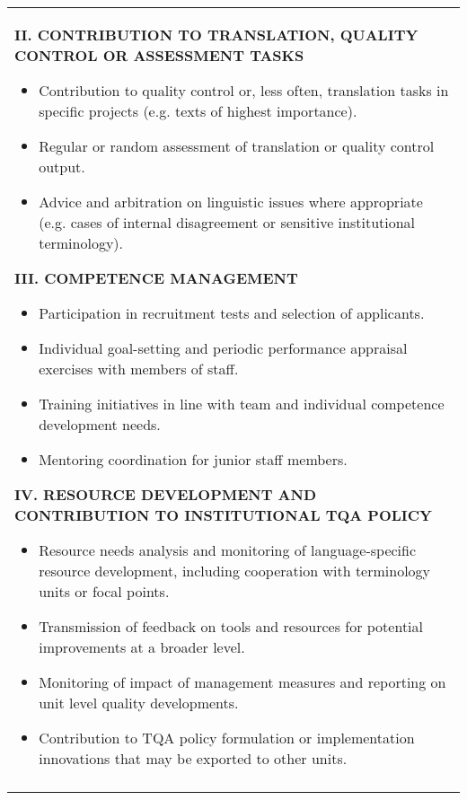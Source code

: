 \documentclass[output=paper]{langsci/langscibook}
\begin{document}
\begin{table}[t]
\footnotesize
\begin{tabularx}{\textwidth}{Q}
\midrule

 \parbox{.9\textwidth}{
\textbf{II. CONTRIBUTION TO TRANSLATION, QUALITY CONTROL OR ASSESSMENT TASKS} 


\begin{itemize}
\item 
Contribution to quality control or, less often, translation tasks in specific projects (e.g. texts of highest importance).
\item 
Regular or random assessment of translation or quality control output.
\item 
Advice and arbitration on linguistic issues where appropriate (e.g. cases of internal disagreement or sensitive institutional terminology).
\end{itemize}

\textbf{III. COMPETENCE MANAGEMENT}


\begin{itemize}
\item 
Participation in recruitment tests and selection of applicants. 
\item 
Individual goal-setting and periodic performance appraisal exercises with members of staff.
\item 
Training initiatives in line with team and individual competence development needs.
\item 
Mentoring coordination for junior staff members.
\end{itemize}

\textbf{IV. RESOURCE DEVELOPMENT AND CONTRIBUTION TO INSTITUTIONAL TQA POLICY}


\begin{itemize}
\item 
Resource needs analysis and monitoring of language-specific resource development, including cooperation with terminology units or focal points.
\item 
Transmission of feedback on tools and resources for potential improvements at a broader level. 
\item 
Monitoring of impact of management measures and reporting on unit level quality developments.
\item 
Contribution to TQA policy formulation or implementation innovations that may be exported to other units.
\end{itemize} 
}\\
\lspbottomrule
\end{tabularx}
\end{table}
\end{document}
